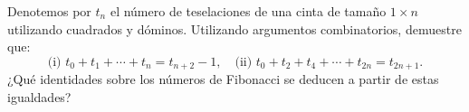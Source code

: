 Denotemos por \(t_n\) el número de teselaciones de una cinta de tamaño \(1\times n\) utilizando cuadrados y dóminos. Utilizando argumentos combinatorios, demuestre que:
\[
\text{(i) }t_0 + t_1 + \cdots + t_n = t_{n+2} - 1,
\quad
\text{(ii) }t_0 + t_2 + t_4 + \cdots + t_{2n} = t_{2n+1}.
\]
¿Qué identidades sobre los números de Fibonacci se deducen a partir de estas igualdades?